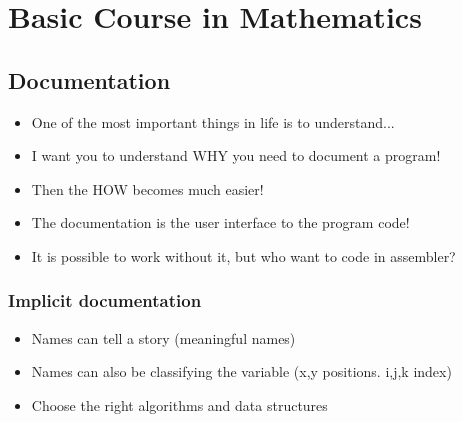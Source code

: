 \chapter{Basic Course in Mathematics}

\newpage






\section{Documentation}
\begin{itemize}
\item One of the most important things in life is to understand...
\item I want you to understand WHY you need to document a program!
\item Then the HOW becomes much easier!
\end{itemize}

\begin{itemize}
\item The documentation is the user interface to the program code!
\item It is possible to work without it, but who want to code in assembler?
\end{itemize}

\subsection{Implicit documentation}
\begin{itemize}
\item Names can tell a story (meaningful names)
\item Names can also be classifying the variable (x,y positions. i,j,k index)
\item Choose the right algorithms and data structures
\end{itemize}


